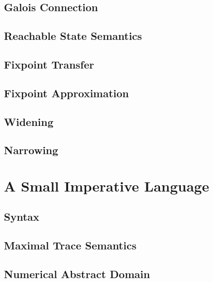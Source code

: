 \subsection{Galois Connection}

\subsection{Reachable State Semantics}

\subsection{Fixpoint Transfer}

\subsection{Fixpoint Approximation}

\subsection{Widening}

\subsection{Narrowing}


\section{A Small Imperative Language}

\subsection{Syntax}

\subsection{Maximal Trace Semantics}

\subsection{Numerical Abstract Domain}

